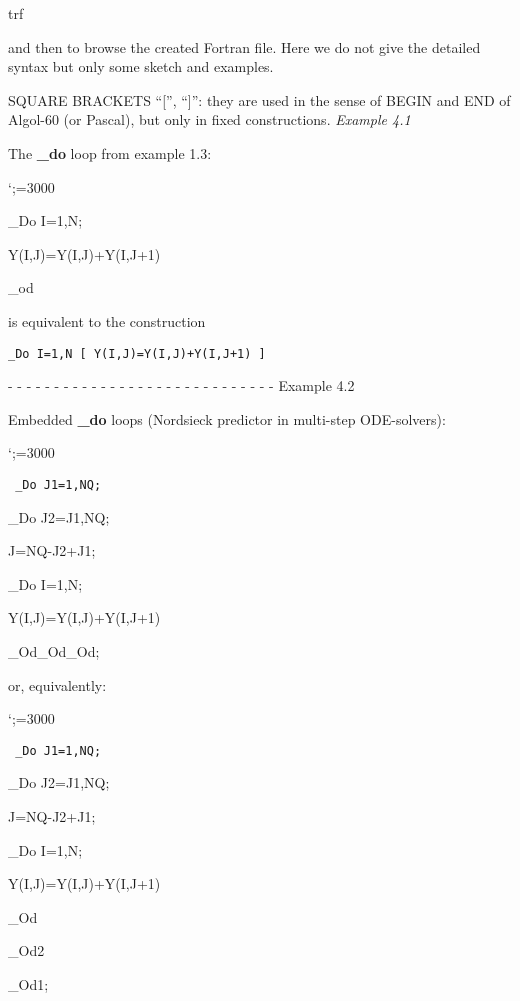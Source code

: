 \quad   trf

\par\noindent and then to browse the created Fortran file.
Here we do not give
the detailed syntax but only some sketch and examples.

\par\noindent SQUARE BRACKETS ``['', ``]'': they are used in the
sense of BEGIN and
END of Algol-60 (or Pascal), but only in fixed constructions.
\smallskip
{\it Example 4.1}

The {\bf \_do} loop from example 1.3:

{\obeylines \sfcode`;=3000
{\tt

 \_Do  I=1,N;

\qquad    Y(I,J)=Y(I,J)+Y(I,J+1)

 \_od } \par}

\par\noindent is equivalent to the construction

{\tt  \_Do  I=1,N [ Y(I,J)=Y(I,J)+Y(I,J+1) ] }

- - - - - - - - - - - - - - - - - - - - - - - - - - - - -
\smallskip
 Example 4.2

\par\noindent Embedded {\bf \_do} loops (Nordsieck predictor in
multi-step ODE-solvers):

{\obeylines \sfcode`;=3000
{\tt
 \_Do J1=1,NQ;

\qquad \_Do J2=J1,NQ;

\qquad \quad  J=NQ-J2+J1;

\qquad \quad \quad  \_Do I=1,N;

\qquad \quad \quad \quad  Y(I,J)=Y(I,J)+Y(I,J+1)

\_Od\_Od\_Od; } \par}

\par\noindent or, equivalently:

{\obeylines \sfcode`;=3000
{\tt
 \_Do J1=1,NQ;

\qquad \_Do J2=J1,NQ;

\qquad \quad J=NQ-J2+J1;

\qquad \quad \quad  \_Do I=1,N;

\qquad \quad \quad \quad  Y(I,J)=Y(I,J)+Y(I,J+1)

\qquad \quad \quad  \_Od

\qquad \_Od2

 \_Od1; } \par}

